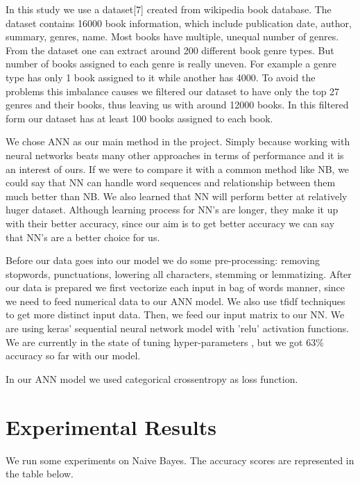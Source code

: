 \documentclass{article}
\begin{document}
In this study we use a dataset[7] created from wikipedia book database. The dataset contains 16000 book information, which include publication date, author, summary, genres, name. Most books have multiple, unequal number of genres. From the dataset one can extract around 200 different book genre types. But number of books assigned to each genre is really uneven. For example a genre type has only 1 book assigned to it while another has 4000. To avoid the problems this imbalance causes we filtered our dataset to have only the top 27 genres and their books, thus leaving us with around 12000 books. In this filtered form our dataset has at least 100 books assigned to each book.

We chose ANN as our main method in the project. Simply because working with neural networks beats many other approaches in terms of performance and it is an interest of ours. If we were to compare it with a common method like NB, we could say that NN can handle word sequences and relationship between them much better than NB. We also learned that NN will perform better at relatively huger dataset. Although learning process for NN's are longer, they make it up with their better accuracy, since our aim is to get better accuracy we can say that NN's are a better choice for us.

Before our data goes into our model we do some pre-processing: removing stopwords, punctuations, lowering all characters, stemming or lemmatizing. After our data is prepared we first vectorize each input in bag of words manner, since we need to feed numerical data to our ANN model. We also use tfidf techniques to get more distinct input data. Then, we feed our input matrix to our NN. We are using keras' sequential neural network model with 'relu' activation functions. We are currently in the state of tuning hyper-parameters , but we got 63\% accuracy so far with our model.

In our ANN model we used  categorical crossentropy as loss function.

\section{Experimental Results}
We run some experiments on Naive Bayes. The accuracy scores are represented in the table below.
\end{document}
